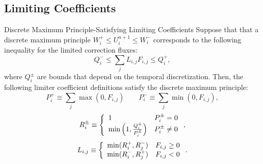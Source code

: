 \subsection{Limiting Coefficients}\label{L}
\begin{theorem}{Discrete Maximum Principle-Satisfying Limiting Coefficients}
   Suppose that that a discrete maximum principle $W_i^+\le U_i^{n+1}\le W_i^-$
   corresponds to the following inequality for the limited correction fluxes:
   \begin{equation}
      Q_i^-\le\sum\limits_j L_{i,j}F_{i,j}\le Q_i^+,
   \end{equation}
   where $Q_i^\pm$ are bounds that depend on the temporal discretization. Then,
   the following limiter coefficient definitions satisfy the discrete maximum
   principle:
   \begin{equation}\label{P_defs}
      P_i^+ \equiv \sum\limits_j\max(0,F_{i,j}) \qquad
      P_i^- \equiv \sum\limits_j\min(0,F_{i,j}),
   \end{equation}
   \begin{equation}\label{R_defs}
      R_i^\pm \equiv\left\{
         \begin{array}{l l}
            1                                          & P_i^\pm = 0\\
            \min\left(1,\frac{Q_i^\pm}{P_i^\pm}\right) & P_i^\pm \ne 0
         \end{array}
         \right.,
   \end{equation}
   \begin{equation}\label{L_defs}
      L_{i,j} \equiv\left\{
         \begin{array}{l l}
            \min(R_i^+,R_j^-) & F_{i,j} \geq 0\\
            \min(R_i^-,R_j^+) & F_{i,j} < 0
         \end{array}
         \right..
   \end{equation}  
\end{theorem}

